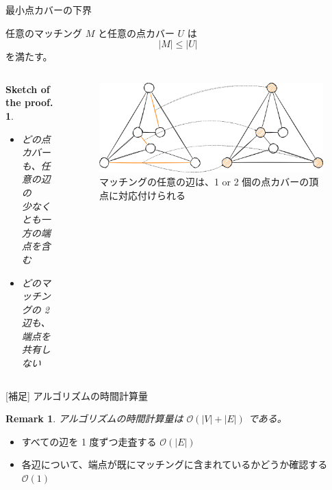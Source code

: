 \documentclass[aspectratio=169]{beamer}
\newtheorem*{sproof}{Sketch of the proof.}
\newtheorem*{remark}{Remark}
\begin{document}
\begin{frame}{最小点カバーの下界}
	\begin{lemma}[点カバーの下界]\label{lem:lower_bound}
		任意のマッチング \(M\) と任意の点カバー \(U\) は
		\begin{equation*}
			|M| \leq |U|
		\end{equation*}
		を満たす。
	\end{lemma}

	\begin{columns}
		\begin{column}{0.47\textwidth}
			\begin{sproof}
				\begin{itemize}
					\item どの点カバーも、任意の辺の \\ 少なくとも一方の端点を含む
					\item どのマッチングの 2 辺も、\\ 端点を共有しない
				\end{itemize}
			\end{sproof}
		\end{column}
		\begin{column}{0.46\textwidth}
			\begin{figure}
				\centering
				\includegraphics[width=1.0\textwidth]{figures/lower-bound.png}
				\caption{マッチングの任意の辺は、1 or 2 個の点カバーの頂点に対応付けられる}
			\end{figure}
		\end{column}
	\end{columns}
\end{frame}

\begin{frame}{[補足] アルゴリズムの時間計算量}
	\begin{remark}
		アルゴリズムの時間計算量は \(\mathcal{O}(|V| + |E|)\) である。
	\end{remark}
	\begin{itemize}
		\item すべての辺を 1 度ずつ走査する \(\mathcal{O}(|E|)\)
		\item 各辺について、端点が既にマッチングに含まれているかどうか確認する \(\mathcal{O}(1)\)
	\end{itemize}
\end{frame}
\end{document}
